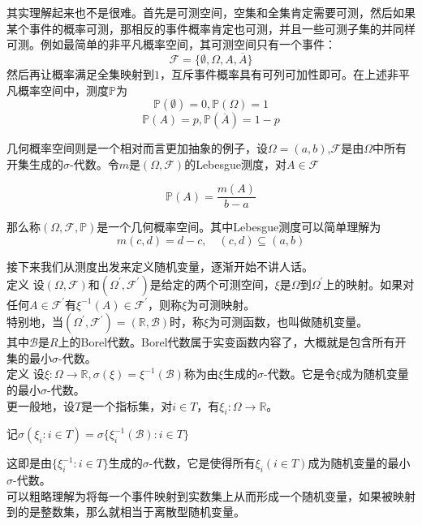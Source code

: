 \documentclass[UTF8]{ctexart}
\begin{document}
其实理解起来也不是很难。首先是可测空间，空集和全集肯定需要可测，然后如果某个事件的概率可测，那相反的事件概率肯定也可测，并且一些可测子集的并同样可测。例如最简单的非平凡概率空间，其可测空间只有一个事件：
$$\mathcal{F}=\{\emptyset ,\Omega ,A,\overline{A} \}$$
然后再让概率满足全集映射到$1$，互斥事件概率具有可列可加性即可。在上述非平凡概率空间中，测度$\mathbb{P}$为
$$\mathbb{P}(\emptyset)=0,\mathbb{P}(\Omega)=1$$
$$\mathbb{P}(A)=p,\mathbb{P}(\overline{A})=1-p$$

几何概率空间则是一个相对而言更加抽象的例子，设$\Omega =(a,b)$,$\mathcal{F}$是由$\Omega$中所有开集生成的$\sigma$-代数。令$m$是$(\Omega ,\mathcal{F})$的Lebesgue测度，对$A\in \mathcal{F}$

$$\mathbb{P}(A)=\frac{m(A)}{b-a}$$

那么称$(\Omega ,\mathcal{F},\mathbb{P})$是一个几何概率空间。其中Lebesgue测度可以简单理解为$$m(c,d)=d-c,\quad (c,d)\subseteq (a,b)$$

接下来我们从测度出发来定义随机变量，逐渐开始不讲人话。\\

定义 设$(\Omega ,\mathcal{F})$和$(\Omega^{\prime},\mathcal{F}^{\prime})$是给定的两个可测空间，$\xi$是$\Omega$到$\Omega^{\prime}$上的映射。如果对任何$A\in \mathcal{F}^{\prime}$有$\xi^{-1}(A)\in \mathcal{F}^{\prime}$，则称$\xi$为可测映射。\\

特别地，当$(\Omega^{\prime},\mathcal{F}^{\prime})=(\mathbb{R},\mathcal{B})$时，称$\xi$为可测函数，也叫做随机变量。\\

其中$\mathcal{B}$是${R}$上的Borel代数。Borel代数属于实变函数内容了，大概就是包含所有开集的最小$\sigma$-代数。\\

定义 设$\xi :\Omega \to \mathbb{R}, \sigma (\xi) = \xi^{-1}(\mathcal{B})$称为由$\xi$生成的$\sigma$-代数。它是令$\xi$成为随机变量的最小$\sigma$-代数。\\

更一般地，设$T$是一个指标集，对$i\in T$，有$\xi_{i}:\Omega \to \mathbb{R}$。

记$\sigma (\xi_{i}:i\in T) = \sigma \{\xi_{i}^{-1}(\mathcal{B}):i\in T\}$

这即是由$\{\xi_{i}^{-1}:i\in T\}$生成的$\sigma$-代数，它是使得所有$\xi_{i}(i\in T)$成为随机变量的最小$\sigma$-代数。\\

可以粗略理解为将每一个事件映射到实数集上从而形成一个随机变量，如果被映射到的是整数集，那么就相当于离散型随机变量。\\
\end{document}
